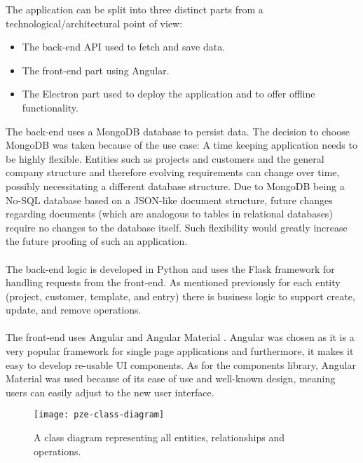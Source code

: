 
The application can be split into three distinct parts from a technological/architectural point of view:
\begin{itemize}
  \item The back-end API used to fetch and save data.
  \item The front-end part using Angular\parencite{angularDocs}.
  \item The Electron part used to deploy the application and to offer offline functionality.
\end{itemize}
The back-end uses a MongoDB \parencite{mongoDocs} database to persist data. 
The decision to choose MongoDB was taken because of the use
case: A time keeping application needs to be highly flexible.
Entities such as projects and customers and the general company structure and therefore evolving requirements can change over time, 
possibly necessitating a different database structure. 
Due to MongoDB being a No-SQL database based on a JSON-like document structure, future changes regarding documents (which are analogous to tables 
in relational databases) require no changes to the database itself.
Such flexibility would greatly increase the future proofing of such an application.\paragraph{}
The back-end logic is developed in Python and uses the Flask framework \parencite{flaskDocs} for handling
requests from the front-end.
As mentioned previously for each entity (project, customer, template, and entry) there is business
logic to support create, update, and remove operations.\paragraph{}
The front-end uses Angular \parencite{angularDocs} and Angular Material \parencite{angularMaterialDocs}.
Angular was chosen as it is a very popular framework for single page applications and furthermore,
it makes it easy to develop re-usable UI components.
As for the components library, Angular Material was used because of its ease of use and well-known design, 
meaning users can easily adjust to the new user interface.
\begin{figure}[H]
  \centering
  \texttt{[image: pze-class-diagram]}
  \caption{A class diagram representing all entities, relationships and operations.}
  \label{fig:pze-class-diagram}
\end{figure}
